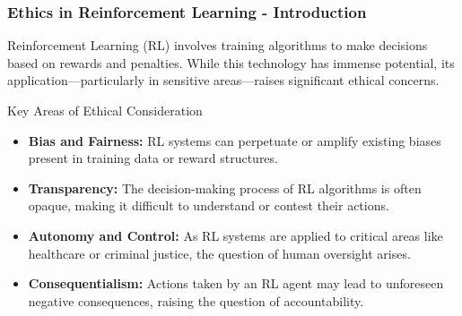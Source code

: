 \documentclass[aspectratio=169]{beamer}
\begin{document}
\begin{frame}[fragile]
    \frametitle{Ethics in Reinforcement Learning - Introduction}
    Reinforcement Learning (RL) involves training algorithms to make decisions based on rewards and penalties. 
    While this technology has immense potential, its application—particularly in sensitive areas—raises significant ethical concerns.

    \begin{block}{Key Areas of Ethical Consideration}
        \begin{itemize}
            \item \textbf{Bias and Fairness:} RL systems can perpetuate or amplify existing biases present in training data or reward structures.
            \item \textbf{Transparency:} The decision-making process of RL algorithms is often opaque, making it difficult to understand or contest their actions.
            \item \textbf{Autonomy and Control:} As RL systems are applied to critical areas like healthcare or criminal justice, the question of human oversight arises.
            \item \textbf{Consequentialism:} Actions taken by an RL agent may lead to unforeseen negative consequences, raising the question of accountability.
        \end{itemize}
    \end{block}
\end{frame}
\end{document}
